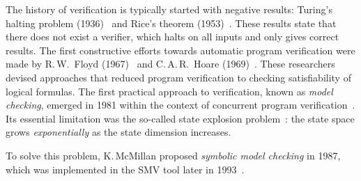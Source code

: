 The history of verification is typically started with negative results: Turing's halting problem (1936)~\cite{turing1936computable} and Rice's theorem (1953)~\cite{10.2307/1990888}. These results state that there does not exist a verifier, which halts on all inputs and only gives correct results.
The first constructive efforts towards automatic program verification were made by R.\,W.~Floyd (1967)~\cite{Floyd1993} and C.\,A.\,R.~Hoare (1969)~\cite{10.1145/363235.363259}. These researchers devised approaches that reduced program verification to checking satisfiability of logical formulas.
The first practical approach to verification, known as \emph{model checking}, emerged in 1981 within the context of concurrent program verification~\cite{10.1007/BFb0025774}.
Its essential limitation was the so-called state explosion problem~\cite{10.1007/978-3-540-69850-0_1}: the state space grows \emph{exponentially} as the state dimension increases.

To solve this problem, K.\,McMillan proposed \emph{symbolic model checking} in 1987, which was implemented in the SMV tool later in 1993~\cite{10.1007/3-540-61474-5_93}.

